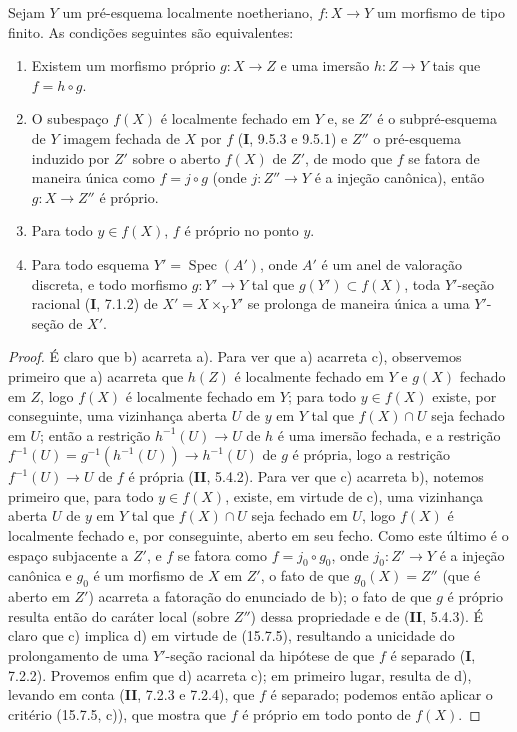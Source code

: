 \begin{corollary}[15.7.6]
\label{IV.15.7.6}
Sejam $Y$ um pré-esquema localmente noetheriano, $f:X\to Y$ um morfismo de tipo finito. As condições seguintes são equivalentes:
\begin{enumerate}
  \item[\rm a)] Existem um morfismo próprio $g:X\to Z$ e uma imersão $h:Z\to Y$ tais que $f=h\circ g$.
  \item[\rm b)] O subespaço $f(X)$ é localmente fechado em $Y$ e, se $Z'$ é o subpré-esquema de $Y$ imagem fechada de $X$ por $f$ (\textbf{I}, 9.5.3 e 9.5.1) e $Z''$ o pré-esquema induzido por $Z'$ sobre o aberto $f(X)$ de $Z'$, de modo que $f$ se fatora de maneira única como $f=j\circ g$ (onde $j:Z''\to Y$ é a injeção canônica), então $g:X\to Z''$ é próprio.
  \item[\rm c)] Para todo $y\in f(X)$, $f$ é próprio no ponto $y$.
  \item[\rm d)] Para todo esquema $Y'=\operatorname{Spec}(A')$, onde $A'$ é um anel de valoração discreta, e todo morfismo $g:Y'\to Y$ tal que $g(Y')\subset f(X)$, toda $Y'$-seção racional (\textbf{I}, 7.1.2) de $X'=X\times_Y Y'$ se prolonga de maneira única a uma $Y'$-seção de $X'$.
\end{enumerate}
\end{corollary}

\begin{proof}
É claro que b) acarreta a). Para ver que a) acarreta c), observemos primeiro que a) acarreta que $h(Z)$ é localmente fechado em $Y$ e $g(X)$ fechado em $Z$, logo $f(X)$ é localmente fechado em $Y$; para todo $y\in f(X)$ existe, por conseguinte, uma vizinhança aberta $U$
de $y$ em $Y$ tal que $f(X)\cap U$ seja fechado em $U$; então a restrição $h^{-1}(U)\to U$ de $h$ é uma imersão fechada, e a restrição $f^{-1}(U)=g^{-1}(h^{-1}(U))\to h^{-1}(U)$ de $g$ é própria, logo a restrição $f^{-1}(U)\to U$ de $f$ é própria (\textbf{II}, 5.4.2). Para ver que c) acarreta b), notemos primeiro que, para todo $y\in f(X)$, existe, em virtude de c), uma vizinhança aberta $U$ de $y$ em $Y$ tal que $f(X)\cap U$ seja fechado em $U$, logo $f(X)$ é localmente fechado e, por conseguinte, aberto em seu fecho. Como este último é o espaço subjacente a $Z'$, e $f$ se fatora como $f=j_0\circ g_0$, onde $j_0:Z'\to Y$ é a injeção canônica e $g_0$ é um morfismo de $X$ em $Z'$, o fato de que $g_0(X)=Z''$ (que é aberto em $Z'$) acarreta a fatoração do enunciado de b); o fato de que $g$ é próprio resulta então do caráter local (sobre $Z''$) dessa propriedade e de (\textbf{II}, 5.4.3). É claro que c) implica d) em virtude de (15.7.5), resultando a unicidade do prolongamento de uma $Y'$-seção racional da hipótese de que $f$ é separado (\textbf{I}, 7.2.2). Provemos enfim que d) acarreta c); em primeiro lugar, resulta de d), levando em conta (\textbf{II}, 7.2.3 e 7.2.4), que $f$ é separado; podemos então aplicar o critério (15.7.5, c)), que mostra que $f$ é próprio em todo ponto de $f(X)$.
\end{proof}

